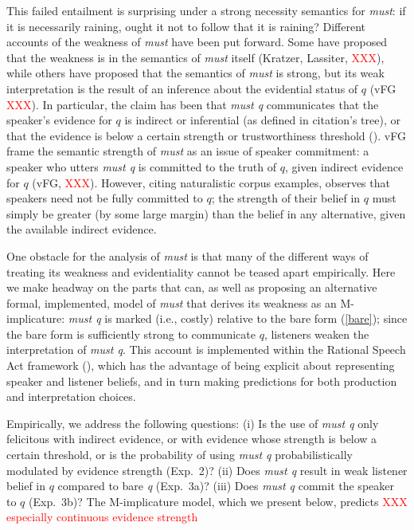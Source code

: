 \documentclass[11pt]{article}
\newcommand{\red}[1]{\textcolor{Red}{#1}}
\begin{document}
This failed entailment is surprising under a strong necessity semantics for \emph{must}: if it is necessarily raining, ought it not to follow that it is raining? Different accounts of the weakness of \emph{must} have been put forward. Some have proposed that the weakness is in the semantics of \emph{must} itself (Kratzer, Lassiter, \red{XXX}), while others have proposed that the semantics of \emph{must} is strong, but its weak interpretation is the result of an inference about the evidential status of $q$ (vFG \red{XXX}). In particular, the claim has been that \emph{must q} communicates that the speaker's evidence for $q$ is indirect or inferential (as defined in \cite{vonfintelgillies2010,lassiter2014salt} citation's tree), or that the evidence is below a certain strength or trustworthiness threshold (\cite{matthewson2015}). vFG frame the semantic strength of \emph{must} as an issue of speaker commitment: a speaker who utters \emph{must q} is committed to the truth of $q$, given indirect evidence for $q$ (vFG, \red{XXX}). However, citing naturalistic corpus examples,  observes that speakers need not be fully committed to $q$; the strength of their belief in $q$ must simply be greater (by some large margin) than the belief in any alternative, given the available indirect evidence.

One obstacle for the analysis of \emph{must} is that many of the different ways of treating its weakness and evidentiality cannot be teased apart empirically. Here we make headway on the parts that can, as well as proposing an alternative formal, implemented, model of \emph{must} that derives its weakness as an M-implicature: \emph{must q} is marked (i.e., costly) relative to the bare form (\ref{bare}); since the bare form is sufficiently strong to communicate $q$, listeners weaken the interpretation of \emph{must q}. This account is implemented within the Rational Speech Act framework (\cite{frank2012, goodmanstuhlmueller2013}), which has the advantage of being explicit about representing speaker and listener beliefs, and in turn making predictions for both production and  interpretation choices.

Empirically, we address the following questions: (i) Is the use of \emph{must q} only felicitous with indirect evidence, or with evidence whose strength is below a certain threshold, or is the probability of using \emph{must q} probabilistically modulated by evidence strength (Exp.~2)? (ii) Does \emph{must q} result in weak listener belief in $q$ compared to bare \emph{q} (Exp.~3a)? (iii) Does \emph{must q} commit the speaker to $q$ (Exp.~3b)? The M-implicature model, which we present below, predicts \red{XXX especially continuous evidence strength}
\end{document}
